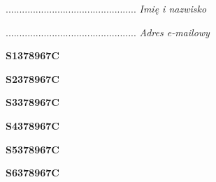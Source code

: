 \begin{turn}{90}\begin{minipage}{\linewidth} \vspace{20mm} ................................................  \textit{Imię i nazwisko}\end{minipage}\end{turn}

\begin{turn}{90}\begin{minipage}{\linewidth} \vspace{20mm} ................................................  \textit{Adres e-mailowy}\end{minipage}\end{turn}

\begin{turn}{90}\huge \begin{minipage}{\linewidth} \vspace{10mm}\textbf{S1378967C}\end{minipage}\end{turn}

\begin{turn}{90}\huge \begin{minipage}{\linewidth} \vspace{10mm}\textbf{S2378967C}\end{minipage}\end{turn}

\begin{turn}{90}\huge \begin{minipage}{\linewidth} \vspace{10mm}\textbf{S3378967C}\end{minipage}\end{turn}

\begin{turn}{90}\huge \begin{minipage}{\linewidth} \vspace{10mm}\textbf{S4378967C}\end{minipage}\end{turn}

\begin{turn}{90}\huge \begin{minipage}{\linewidth} \vspace{10mm}\textbf{S5378967C}\end{minipage}\end{turn}

\begin{turn}{90}\huge \begin{minipage}{\linewidth} \vspace{10mm}\textbf{S6378967C}\end{minipage}\end{turn}

